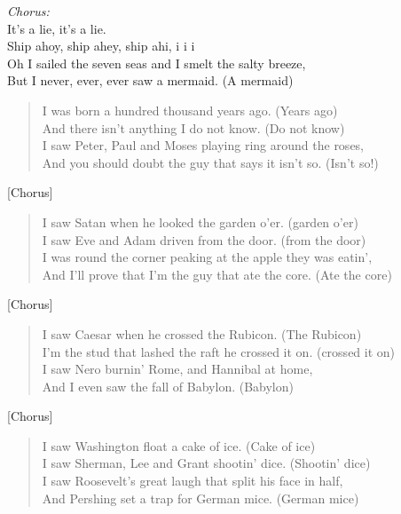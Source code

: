 
\begin{center}
\textit{Chorus:} \\
It's a lie, it's a lie. \\
Ship ahoy, ship ahey, ship ahi, i i i \\
Oh I sailed the seven seas and I smelt the salty breeze, \\
But I never, ever, ever saw a mermaid. (A mermaid) \\
\end{center}

\begin{verse}
I was born a hundred thousand years ago. (Years ago) \\
And there isn't anything I do not know. (Do not know) \\
I saw Peter, Paul and Moses playing ring around the roses, \\
And you should doubt the guy that says it isn't so. (Isn't so!) \\
\end{verse}

[Chorus]

\begin{verse}
I saw Satan when he looked the garden o'er. (garden o'er) \\
I saw Eve and Adam driven from the door. (from the door) \\
I was round the corner peaking at the apple they was eatin', \\
And I'll prove that I'm the guy that ate the core. (Ate the core) \\
\end{verse}

[Chorus]

\begin{verse}
I saw Caesar when he crossed the Rubicon. (The Rubicon) \\
I'm the stud that lashed the raft he crossed it on. (crossed it on) \\
I saw Nero burnin' Rome, and Hannibal at home, \\
And I even saw the fall of Babylon. (Babylon) \\
\end{verse}

[Chorus]

\begin{verse}
I saw Washington float a cake of ice. (Cake of ice) \\
I saw Sherman, Lee and Grant shootin' dice. (Shootin' dice) \\
I saw Roosevelt's great laugh that split his face in half, \\
And Pershing set a trap for German mice. (German mice) \\
\end{verse}

